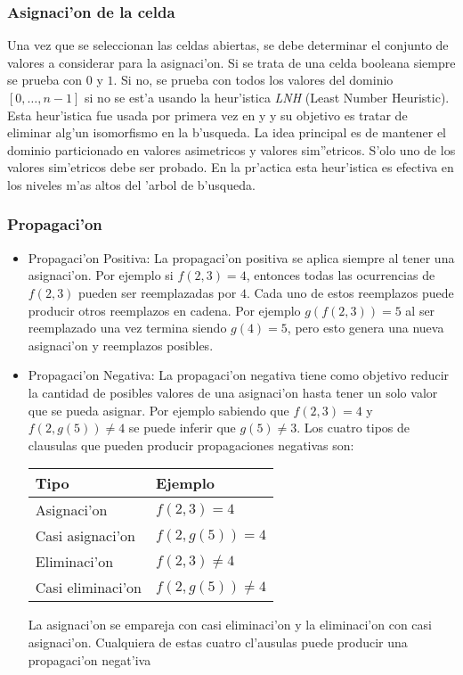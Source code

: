 \subsubsection{Asignaci'on de la celda}
Una vez que se seleccionan las celdas abiertas, se debe determinar el conjunto de valores a considerar para la asignaci'on. Si se trata de una celda booleana siempre se prueba con $0$ y $1$. Si no, se prueba con todos los valores del dominio $[0,\dots,n-1]$ si no se est'a usando la heur'istica \textit{LNH} (Least Number Heuristic). Esta heur'istica fue usada por primera vez en \cite{zhang95} y \cite{zhang96} y su objetivo es tratar de eliminar alg'un isomorfismo en la b'usqueda. La idea principal es de mantener el dominio particionado en valores asimetricos y valores sim''etricos. S'olo uno de los valores sim'etricos debe ser probado. En la pr'actica esta heur'istica es efectiva en los niveles m'as altos del 'arbol de b'usqueda.


\subsubsection{Propagaci'on}

\begin{itemize}

\item{Propagaci'on Positiva}:
La propagaci'on positiva se aplica siempre al tener una asignaci'on. Por ejemplo si $f(2,3)=4$, entonces todas las ocurrencias de $f(2,3)$ pueden ser reemplazadas por $4$. Cada uno de estos reemplazos puede producir otros reemplazos en cadena. Por ejemplo $g(f(2,3))=5$ al ser reemplazado una vez termina siendo $g(4)=5$, pero esto genera una nueva asignaci'on y reemplazos posibles.

\item{Propagaci'on Negativa}:
La propagaci'on negativa tiene como objetivo reducir la cantidad de posibles valores de una asignaci'on hasta tener un solo valor que se pueda asignar. Por ejemplo sabiendo que $f(2,3)=4$ y $f(2, g(5))\neq4$ se puede inferir que $g(5)\neq3$. Los cuatro tipos de clausulas que pueden producir propagaciones negativas son:

\medskip
\begin{center}
\begin{tabular}{ |l|l| }
\hline
Tipo & Ejemplo \\
\hline
Asignaci'on & $f(2,3)=4$ \\
Casi asignaci'on & $f(2,g(5))=4$ \\
Eliminaci'on & $f(2,3)\neq4$ \\
Casi eliminaci'on & $f(2,g(5))\neq4$ \\
\hline
\end{tabular}
\end{center}
\medskip

La asignaci'on se empareja con casi eliminaci'on y la eliminaci'on con casi asignaci'on. Cualquiera de estas cuatro cl'ausulas puede producir una propagaci'on negat'iva

\end{itemize}
